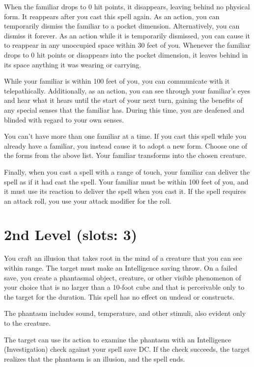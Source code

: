 \documentclass[letterpaper,twocolumn,openany,nodeprecatedcode,justified]{dndbook}
\begin{document}
When the familiar drops to 0 hit points, it disappears, leaving behind no physical form. It reappears after you cast this spell again. As an action, you can temporarily dismiss the familiar to a pocket dimension. Alternatively, you can dismiss it forever. As an action while it is temporarily dismissed, you can cause it to reappear in any unoccupied space within 30 feet of you. Whenever the familiar drops to 0 hit points or disappears into the pocket dimension, it leaves behind in its space anything it was wearing or carrying.

While your familiar is within 100 feet of you, you can communicate with it telepathically. Additionally, as an action, you can see through your familiar's eyes and hear what it hears until the start of your next turn, gaining the benefits of any special senses that the familiar has. During this time, you are deafened and blinded with regard to your own senses.

You can't have more than one familiar at a time. If you cast this spell while you already have a familiar, you instead cause it to adopt a new form. Choose one of the forms from the above list. Your familiar transforms into the chosen creature.

Finally, when you cast a spell with a range of touch, your familiar can deliver the spell as if it had cast the spell. Your familiar must be within 100 feet of you, and it must use its reaction to deliver the spell when you cast it. If the spell requires an attack roll, you use your attack modifier for the roll.

\section{2nd Level (slots: 3)}


You craft an illusion that takes root in the mind of a creature that you can see within range. The target must make an Intelligence saving throw. On a failed save, you create a phantasmal object, creature, or other visible phenomenon of your choice that is no larger than a 10-foot cube and that is perceivable only to the target for the duration. This spell has no effect on undead or constructs.

The phantasm includes sound, temperature, and other stimuli, also evident only to the creature.

The target can use its action to examine the phantasm with an Intelligence (Investigation) check against your spell save DC. If the check succeeds, the target realizes that the phantasm is an illusion, and the spell ends.
\end{document}
